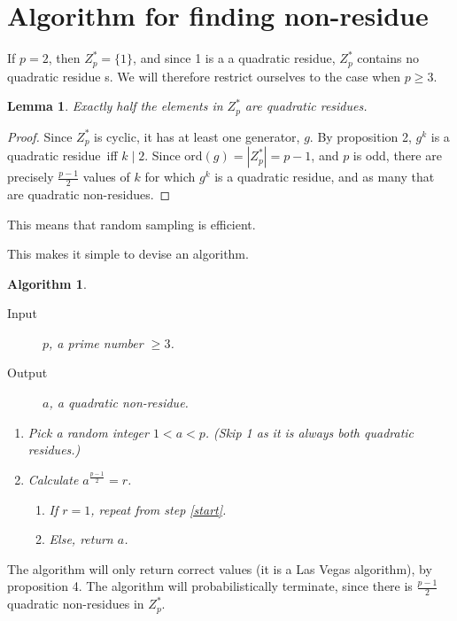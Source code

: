 \documentclass{article}
\title{\Qr}
\author{Rikard Hjort}
\date{\today}
\newcommand{\z}{Z^*_p}
\newcommand{\ord}{\text{ord}}
\newcommand{\qr}{{quadratic residue}}
\newcommand{\qnr}{{quadratic non-residue}}
\newtheorem{algorithm}[theorem]{Algorithm}
\newtheorem{lemma}[theorem]{Lemma}
\begin{document}
\maketitle
\section{Algorithm for finding non-residue}

If $p = 2$, then $\z = \{1\}$, and since 1 is a a \qr, $\z$ contains no \qr
s. We will therefore restrict ourselves to the case when $p \geq 3$.

\begin{lemma}\label{half}
  Exactly half the elements in $\z$ are \qr s.
\end{lemma}
\begin{proof}
  Since $\z$ is cyclic, it has at least one generator, $g$. By proposition 2,
  $g^k$ is a \qr~iff $k \mid 2$. Since $\ord(g) = |\z|= p-1$, and $p$ is odd,
  there are precisely $\frac{p-1}{2}$ values of $k$ for which $g^k$ is a \qr,
  and as many that are \qnr s.
\end{proof}

This means that random sampling is efficient.

This makes it simple to devise an algorithm.
\begin{algorithm}
  \hfill\break
  \begin{description}
  \item[Input] $p$, a prime number $\geq 3$.
  \item[Output] $a$, a \qnr.
  \end{description}
  \begin{enumerate}
  \item\label{start} Pick a random integer $1 < a < p$. (Skip 1 as it is always
    both \qr s.)
  \item Calculate $a^{\frac{p-1}{2}} = r$.
    \begin{enumerate}
    \item If $r = 1$, repeat from step \ref{start}.
    \item Else, return $a$.
    \end{enumerate}
  \end{enumerate}
\end{algorithm}

The algorithm will only return correct values (it is a Las Vegas algorithm),
by proposition 4. The algorithm will probabilistically terminate, since
there is $\frac{p-1}{2}$ \qnr s in $\z$.
\end{document}
